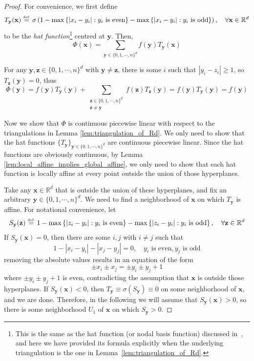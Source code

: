 \documentclass{article}
\numberwithin{equation}{section}
\theoremstyle{definition}
\newcommand{\eqdef}{\ensuremath{\stackrel{\mbox{\upshape\tiny def.}}{=}}}
\begin{document}
\begin{proof}
For convenience, we first define
\begin{equation}
\label{eq:hat}
T_{\mathbf{y}}(\mathbf{x})  \eqdef  
\sigma
\left(
    1 - 
    \max
    \left\{
        | x_i - y_i | :
        y_i \text{ is even}
    \right\}
    -
    \max
    \left\{
        | x_i - y_i | :
        y_i \text{ is odd}
    \right\}
\right), \quad
\forall \mathbf{x}\in\mathbb{R}^d
\end{equation}
to be the \emph{hat function}\footnote{This is the same as the hat function (or nodal basis function) discussed in~\cite{goujon2023stable_ACHA}, and here we have provided its formula explicitly when the underlying triangulation is the one in Lemma~\ref{lem:triangulation_of_Rd}.} centred at $\mathbf{y}$. Then, 
$$\Phi(\mathbf{x}) = 
\sum_{
\mathbf{y}\in\{0,1,\cdots,n\}^d
}
f(\mathbf{y})
T_{\mathbf{y}}(\mathbf{x})
$$

For any $\mathbf{y},\mathbf{z}\in\{0,1,\cdots,n\}^d$ with $\mathbf{y} \ne \mathbf{z}$, there is some $i$ such that $|y_i-z_i| \ge 1$, so $T_{\mathbf{z}}(\mathbf{y})=0$, thus
$$\Phi(\mathbf{y}) = 
f(\mathbf{y}) T_{\mathbf{y}}(\mathbf{y})
+
\sum_{\substack{
\mathbf{z} \in \{0,1,\cdots,n\}^d \\
\mathbf{z} \ne \mathbf{y}
}}
f(\mathbf{z})
T_{\mathbf{z}}(\mathbf{y})
=
f(\mathbf{y}) T_{\mathbf{y}}(\mathbf{y})
=
f(\mathbf{y})
$$

Now we show that $\Phi$ is continuous piecewise linear with respect to the triangulations in Lemma \ref{lem:triangulation_of_Rd}. We only need to show that the hat functions $\{T_{\mathbf{y}}\}_{\mathbf{y}\in\{0,1,\cdots,n\}^d}$ are continuous piecewise linear. Since the hat functions are obviously continuous, by Lemma \ref{lem:local_affine_implies_global_affine}, we only need to show that each hat function is locally affine at every point outside the union of those hyperplanes.

Take any $\mathbf{x}\in\mathbb{R}^d$ that is outside the union of these hyperplanes, and fix an arbitrary $\mathbf{y}\in\{0,1,\cdots,n\}^d$. We need to find a neighborhood of $\mathbf{x}$ on which $T_{\mathbf{y}}$ is affine. For notational convenience, let
$$
S_{\mathbf{y}}(\mathbf{z})  \eqdef  
1 - 
\max
\left\{
    | z_i - y_i | :
    y_i \text{ is even}
\right\}
-
\max
\left\{
    | z_i - y_i | :
    y_i \text{ is odd}
\right\}, \quad
\forall \mathbf{z}\in\mathbb{R}^d
$$
If $S_{\mathbf{y}}(\mathbf{x})=0$, then there are some $i,j$ with $i\ne j$ such that
$$1 - |x_i-y_i| - |x_j-y_j| = 0, \quad 
y_i \text{ is even}, y_j \text{ is odd}$$
removing the absolute values results in an equation of the form
$$\pm x_i \pm x_j = \pm y_i \pm y_j + 1$$
where $\pm y_i \pm y_j + 1$ is even, contradicting the assumption that $\mathbf{x}$ is outside those hyperplanes. If $S_{\mathbf{y}}(\mathbf{x}) < 0$, then $T_{\mathbf{y}}\equiv\sigma(S_{\mathbf{y}})\equiv 0$ on some neighborhood of $\mathbf{x}$, and we are done. Therefore, in the following we will assume that $S_{\mathbf{y}}(\mathbf{x})>0$, so there is some neighborhood $U_1$ of $\mathbf{x}$ on which $S_{\mathbf{y}}>0$.


\end{proof}
\end{document}
